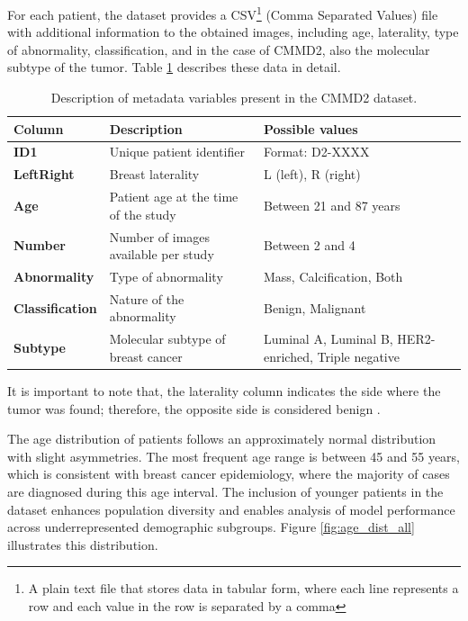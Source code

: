 \documentclass[a4paper,10pt]{book}
\begin{document}
For each patient, the dataset provides a CSV\footnote{A plain text file that stores data in tabular form, where each line represents a row and each value in the row is separated by a comma} (Comma Separated Values) file with additional information to the obtained images, including age, laterality, type of abnormality, classification, and in the case of CMMD2, also the molecular subtype of the tumor. Table \ref{tab:cmmd2_metadata} describes these data in detail.

\begin{table}[h!]
	\caption[CMMD2 metadata description]{Description of metadata variables present in the CMMD2 dataset.}
	\centering
	\begin{tabular}{>{\bfseries}l p{5cm} p{6cm}}
		\toprule
		\textbf{Column} & \textbf{Description}                 & \textbf{Possible values}                             \\
		\midrule
		ID1             & Unique patient identifier            & Format: D2-XXXX                                      \\
		LeftRight       & Breast laterality                    & L (left), R (right)                                  \\
		Age             & Patient age at the time of the study & Between 21 and 87 years                              \\
		Number          & Number of images available per study & Between 2 and 4                                      \\
		Abnormality     & Type of abnormality                  & Mass, Calcification, Both                            \\
		Classification  & Nature of the abnormality            & Benign, Malignant                                    \\
		Subtype         & Molecular subtype of breast cancer   & Luminal A, Luminal B, HER2-enriched, Triple negative \\
		\bottomrule
	\end{tabular}

	\label{tab:cmmd2_metadata}
\end{table}

It is important to note that, the laterality column indicates the side where the tumor was found; therefore, the opposite side is considered benign \cite{cai_online_2023}.

The age distribution of patients follows an approximately normal distribution with slight asymmetries. The most frequent age range is between 45 and 55 years, which is consistent with breast cancer epidemiology, where the majority of cases are diagnosed during this age interval. The inclusion of younger patients in the dataset enhances population diversity and enables analysis of model performance across underrepresented demographic subgroups. Figure \ref{fig:age_dist_all} illustrates this distribution.
\end{document}
